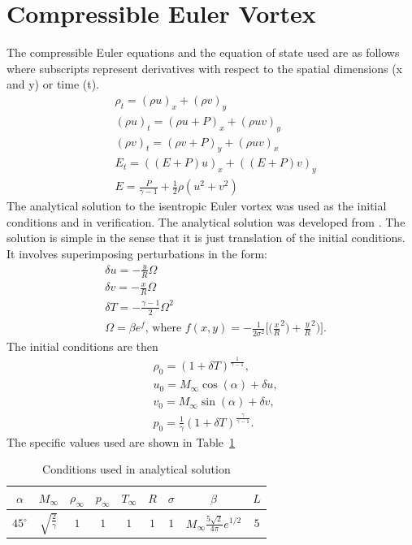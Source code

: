 \documentclass[preprints,article,accept,moreauthors,pdftex]{Definitions/mdpi}
\begin{document}
\section{Compressible Euler Vortex}
\label{Compressible-Euler}
The compressible Euler equations and the equation of state used are as follows where subscripts represent derivatives with respect to the spatial dimensions (x and y) or time (t).
\begin{align*}
    &\rho_t  = (\rho u)_x + (\rho v)_y \\ 
    &(\rho u)_t  = (\rho u+P)_x + (\rho u v)_y\\
    &(\rho v)_t  = (\rho v+P)_y + (\rho u v)_x\\
    &E_t = ((E+P)u)_x+((E+P)v)_y\\
    &E = \frac{P}{\gamma -1}+\frac{1}{2}\rho(u^2+v^2)
\end{align*}
The analytical solution to the isentropic Euler vortex was used as the initial conditions and in verification. The analytical solution was developed from \cite{SpiegelAMethods}. The solution is simple in the sense that it is just translation of the initial conditions. It involves superimposing perturbations in the form:
\begin{align*}
    &\delta u = -\frac{y}{R}\Omega\\
    &\delta v = -\frac{x}{R}\Omega\\
    &\delta T = -\frac{\gamma-1}{2} \Omega^2\\
    &\Omega = \beta e^{f}\text{, where } f(x,y) = -\frac{1}{2\sigma^2}\Bigg[\bigg(\frac{x}{R}^2\bigg)+\frac{y}{R}^2\bigg)\Bigg].
\end{align*}
The initial conditions are then 
\begin{align*}
    &\rho_0 = (1+\delta T)^{\frac{1}{\gamma-1}},\\
    &u_0 = M_\infty \cos(\alpha)+\delta u,\\
    &v_0 = M_\infty \sin(\alpha)+\delta v,\\
    &p_0 = \frac{1}{\gamma}(1+\delta T)^\frac{\gamma}{\gamma-1}.
\end{align*}
The specific values used are shown in Table~\ref{tab:eulerVortex}
\begin{table}[htb!]
    \centering
    \begin{tabular}{|c|c|c|c|c|c|c|c|c|}
    \hline
         $\alpha$ & $M_\infty$  & $\rho_\infty$ & $p_\infty$ & $T_\infty$ & $R$ & $\sigma$ & $\beta$ & $L$\\\hline
         $45^\circ$ &  $\sqrt{\frac{2}{\gamma}}$ & $1$ & $1$ & $1$ & $1$ & $1$ & $M_\infty \frac{5\sqrt{2}}{4\pi}e^{1/2}$ & $5$\\ \hline
    \end{tabular}
    \caption{Conditions used in analytical solution \cite{shu1998essentially}}
    \label{tab:eulerVortex}
\end{table}
\end{document}

